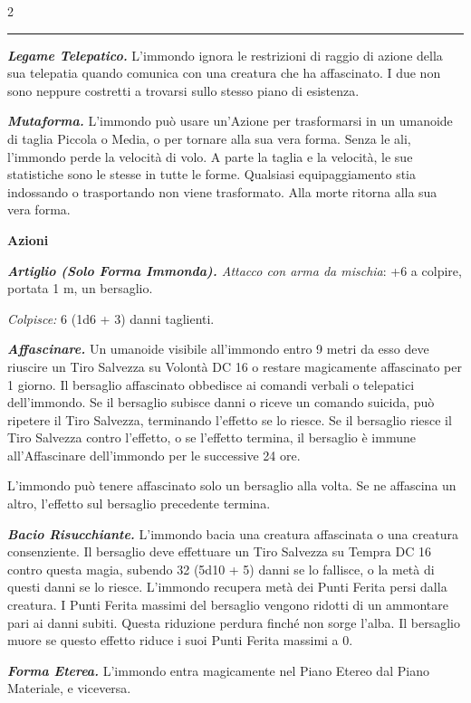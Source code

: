 \begin{multicols}{2}
{\noindent\rule{\linewidth}{2pt}

\medskip

\emph{\textbf{Legame Telepatico.}} L'immondo ignora le restrizioni di raggio di azione della sua telepatia quando comunica con una creatura che ha affascinato. I due non sono neppure costretti a trovarsi sullo stesso piano di esistenza.

\emph{\textbf{Mutaforma.}} L'immondo può usare un'Azione per trasformarsi in un umanoide di taglia Piccola o Media, o per tornare alla sua vera forma. Senza le ali, l'immondo perde la velocità di volo. A parte la taglia e la velocità, le sue statistiche sono le stesse in tutte le forme. Qualsiasi equipaggiamento stia indossando o trasportando non viene trasformato. Alla morte ritorna alla sua vera forma.

\textbf{Azioni}

\emph{\textbf{Artiglio (Solo Forma Immonda).} Attacco con arma da mischia}: +6 a colpire, portata 1 m, un bersaglio.

\emph{Colpisce:} 6 (1d6 + 3) danni taglienti.

\emph{\textbf{Affascinare.}} Un umanoide visibile all'immondo entro 9 metri da esso deve riuscire un Tiro Salvezza su Volontà DC 16 o restare magicamente affascinato per 1 giorno. Il bersaglio affascinato obbedisce ai comandi verbali o telepatici dell'immondo. Se il bersaglio subisce danni o riceve un comando suicida, può ripetere il Tiro Salvezza, terminando l'effetto se lo riesce. Se il bersaglio riesce il Tiro Salvezza contro l'effetto, o se l'effetto termina, il bersaglio è immune all'Affascinare dell'immondo per le successive 24 ore.

L'immondo può tenere affascinato solo un bersaglio alla volta. Se ne affascina un altro, l'effetto sul bersaglio precedente termina.

\emph{\textbf{Bacio Risucchiante.}} L'immondo bacia una creatura affascinata o una creatura consenziente. Il bersaglio deve effettuare un Tiro Salvezza su Tempra DC 16 contro questa magia, subendo 32 (5d10 + 5) danni se lo fallisce, o la metà di questi danni se lo riesce. L'immondo recupera metà dei Punti Ferita persi dalla creatura. I Punti Ferita massimi del bersaglio vengono ridotti di un ammontare pari ai danni subiti. Questa riduzione perdura finché non sorge l'alba. Il bersaglio muore se questo effetto riduce i suoi Punti Ferita massimi a 0.

\emph{\textbf{Forma Eterea.}} L'immondo entra magicamente nel Piano Etereo dal Piano Materiale, e viceversa.

}
\end{multicols}
